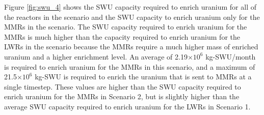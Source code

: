 Figure \ref{fig:swu_4} shows the \gls{SWU} capacity required to 
enrich uranium for all of the reactors in the scenario and the 
\gls{SWU} capacity to enrich uranium only for the \glspl{MMR} in 
the scenario. The \gls{SWU} capacity required to enrich uranium 
for the \glspl{MMR} is much higher than the capacity required to 
enrich uranium for the \glspl{LWR} in the scenario because
the \glspl{MMR} require a much higher mass of enriched uranium 
and a higher enrichment level. An average of 2.19$\times 10^6$ 
kg-\gls{SWU}/month is required to enrich uranium for the \glspl{MMR}
in this scenario, and a maximum of 21.5$\times 10^6$ kg-\gls{SWU}
is required to enrich the uranium that is sent to \glspl{MMR} at 
a single timestep. These values are higher than the \gls{SWU} 
capacity required to enrich uranium for the \glspl{MMR} in 
Scenario 2, but is slightly higher than the average \gls{SWU} capacity 
required to enrich uranium for the \glspl{LWR} in Scenario 1. 

